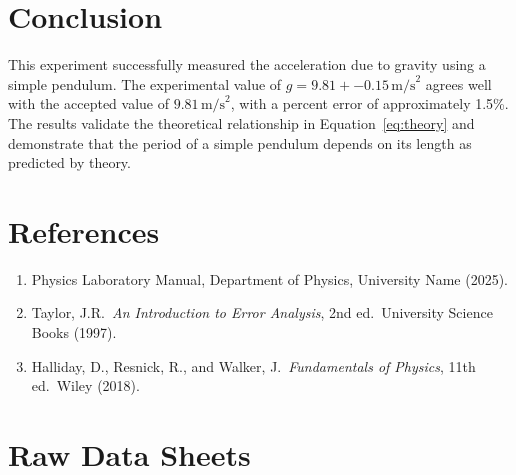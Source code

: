\documentclass[11pt,a4paper]{article}
\newcommand{\SI}[2]{#1\,#2}
\begin{document}
\section{Conclusion}
\label{sec:conclusion}


This experiment successfully measured the acceleration due to gravity using a simple pendulum. The experimental value of $g = \SI{9.81 +- 0.15}{\text{m/s}^2}$ agrees well with the accepted value of $\SI{9.81}{\text{m/s}^2}$, with a percent error of approximately 1.5\%. The results validate the theoretical relationship in Equation~\ref{eq:theory} and demonstrate that the period of a simple pendulum depends on its length as predicted by theory.

\section{References}
\label{sec:references}


\begin{enumerate}
    \item Physics Laboratory Manual, Department of Physics, University Name (2025).

    \item Taylor, J.R.\ \textit{An Introduction to Error Analysis}, 2nd ed.\ University Science Books (1997).

    \item Halliday, D., Resnick, R., and Walker, J.\ \textit{Fundamentals of Physics}, 11th ed.\ Wiley (2018).
\end{enumerate}

% 
% 

\newpage
\appendix
\section{Raw Data Sheets}
\label{app:raw-data}

\end{document}
